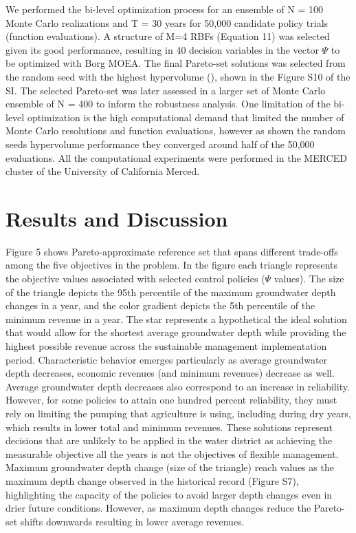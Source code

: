 \documentclass[a4paper,fleqn]{cas-sc}
\begin{document}
We performed the bi-level optimization process for an ensemble of N = 100 Monte Carlo realizations and T = 30 years for 50,000 candidate policy trials (function evaluations). A structure of M=4 RBFs (Equation 11) was selected given its good performance, resulting in 40 decision variables in the vector  $\Psi$ to be optimized with Borg MOEA. The final Pareto-set solutions was selected from the random seed with the highest hypervolume (\cite{hadka_large-scale_2015,reed_evolutionary_2013}), shown in the Figure S10 of the SI. The selected Pareto-set was later assessed in a larger set of Monte Carlo ensemble of N = 400 to inform the robustness analysis. One limitation of the bi-level optimization is the high computational demand that limited the number of Monte Carlo resolutions and function evaluations, however as shown the random seeds hypervolume performance they converged around half of the 50,000 evaluations. All the computational experiments were performed in the MERCED cluster of the University of California Merced. 

\section{Results and Discussion}

Figure 5 shows  Pareto-approximate reference set that spans different trade-offs among the five objectives in the problem. In the figure each triangle represents the objective values associated with selected control policies ($\Psi$ values). The size of the triangle depicts the 95th percentile of the maximum groundwater depth changes in a year, and the color gradient depicts the 5th percentile of the minimum revenue in a year. The star represents a hypothetical the ideal solution that would allow for the shortest average groundwater depth while providing the highest possible revenue across the sustainable management implementation period. Characteristic behavior emerges particularly as average groundwater depth decreases, economic revenues (and minimum revenues) decrease as well. Average groundwater depth decreases also correspond to an increase in reliability. However, for some policies to attain one hundred percent reliability, they must rely on limiting the pumping that agriculture is using, including during dry years, which results in lower total and minimum revenues. These solutions represent decisions that are unlikely to be applied in the water district as achieving the measurable objective all the years is not the objectives of flexible management. Maximum groundwater depth change (size of the triangle) reach values as the maximum depth change observed in the historical record (Figure S7), highlighting the capacity of the policies to avoid larger depth changes even in drier future conditions. However, as maximum depth changes reduce the Pareto-set shifts downwards resulting in lower average revenues. 
\end{document}
